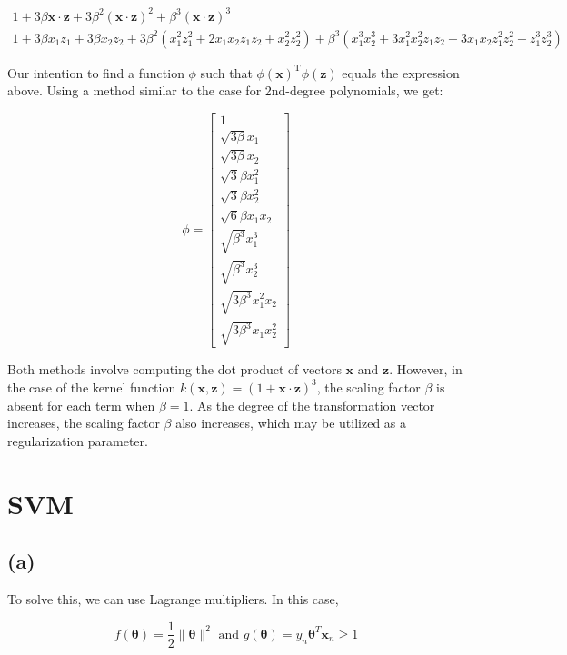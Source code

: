 \documentclass[11pt]{article}
\newcommand{\sol}[1]{{\bf{\color{magenta}{{Solution:}}}}}
\begin{document}
$$
\begin{gathered}
1+3 \beta \mathbf{x} \cdot \mathbf{z}+3 \beta^{2}(\mathbf{x} \cdot \mathbf{z})^{2}+\beta^{3}(\mathbf{x} \cdot \mathbf{z})^{3} \\
1+3 \beta x_{1} z_{1}+3 \beta x_{2} z_{2}+3 \beta^{2}\left(x_{1}^{2} z_{1}^{2}+2 x_{1} x_{2} z_{1} z_{2}+x_{2}^{2} z_{2}^{2}\right)+\beta^{3}\left(x_{1}^{3} x_{2}^{3}+3 x_{1}^{2} x_{2}^{2} z_{1} z_{2}+3 x_{1} x_{2} z_{1}^{2} z_{2}^{2}+z_{1}^{3} z_{2}^{3}\right)
\end{gathered}
$$

Our intention to find a function $\phi$ such that $\phi(\mathbf{x})^{\mathrm{T}} \phi(\mathbf{z})$ equals the expression above. Using a method similar to the case for 2nd-degree polynomials, we get:

$$
\phi=\left[\begin{array}{c}
1 \\
\sqrt{3 \beta} x_{1} \\
\sqrt{3 \beta} x_{2} \\
\sqrt{3} \beta x_{1}^{2} \\
\sqrt{3} \beta x_{2}^{2} \\
\sqrt{6} \beta x_{1} x_{2} \\
\sqrt{\beta^{3}} x_{1}^{3} \\
\sqrt{\beta^{3}} x_{2}^{3} \\
\sqrt{3 \beta^{3}} x_{1}^{2} x_{2} \\
\sqrt{3 \beta^{3}} x_{1} x_{2}^{2}
\end{array}\right]
$$

Both methods involve computing the dot product of vectors $\mathbf{x}$ and $\mathbf{z}$. However, in the case of the kernel function $k(\mathbf{x}, \mathbf{z})=(1+\mathbf{x} \cdot \mathbf{z})^{3}$, the scaling factor $\beta$ is absent for each term when $\beta=1$. As the degree of the transformation vector increases, the scaling factor $\beta$ also increases, which may be utilized as a regularization parameter.

\section{SVM}

\subsection{(a)}
\sol x To solve this, we can use Lagrange multipliers. In this case,

$$
f(\boldsymbol{\theta})=\frac{1}{2}\|\boldsymbol{\theta}\|^{2} \text { and } g(\boldsymbol{\theta})=y_{n} \boldsymbol{\theta}^{T} \mathbf{x}_{n} \geq 1
$$
\end{document}
